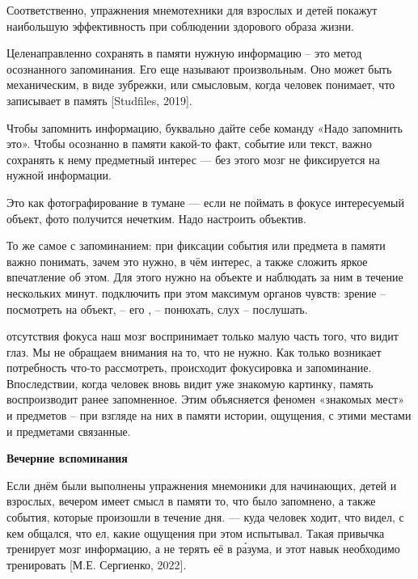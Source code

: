 Соответственно, упражнения мнемотехники для взрослых и детей покажут наибольшую эффективность при соблюдении здорового образа жизни.

\textbf{ }

Целенаправленно сохранять в памяти нужную информацию – это метод осознанного запоминания. Его еще называют произвольным. Оно может быть механическим, в виде зубрежки, или смысловым, когда человек понимает, что записывает в память [Studfiles, 2019].

\begin{fancyquotes}
    Чтобы запомнить информацию, буквально дайте себе команду «Надо запомнить это». Чтобы осознанно  в памяти какой-то факт, событие или текст, важно сохранять к нему предметный интерес --- без этого мозг не фиксируется на нужной информации.
\end{fancyquotes}

Это как фотографирование в тумане --- если не поймать в фокусе интересуемый объект, фото получится нечетким. Надо настроить объектив.

То же самое с запоминанием: при фиксации события или предмета в памяти важно понимать, зачем это нужно, в чём интерес, а также сложить яркое впечатление об этом. Для этого нужно  на объекте и наблюдать за ним в течение нескольких минут.  подключить при этом максимум органов чувств: зрение – посмотреть на объект,  –  его ,  – понюхать, слух – послушать.

 отсутствия фокуса наш мозг воспринимает только малую часть того, что видит глаз. Мы не обращаем внимания на то, что не нужно. Как только возникает потребность что-то рассмотреть, происходит фокусировка и запоминание. Впоследствии, когда человек вновь видит уже знакомую картинку, память воспроизводит ранее запомненное. Этим объясняется феномен «знакомых мест» и предметов – при взгляде на них в памяти  истории, ощущения, с этими местами и предметами связанные.

\textbf{Вечерние вспоминания}

Если днём были выполнены упражнения мнемоники для начинающих, детей и взрослых, вечером имеет смысл  в памяти то, что было запомнено, а также события, которые произошли в течение дня.   --- куда человек ходит, что видел, с кем общался, что ел, какие ощущения при этом испытывал. Такая привычка тренирует мозг  информацию, а не терять её в  р\'{а}зума, и этот навык необходимо тренировать [М.Е. Сергиенко, 2022].

